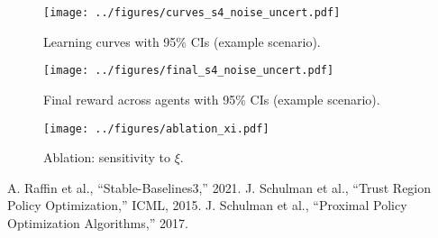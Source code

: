 \documentclass[10pt,conference]{IEEEtran}
\begin{document}
\begin{figure}[t]
\centering
\texttt{[image: ../figures/curves\_s4\_noise\_uncert.pdf]}
\caption{Learning curves with 95\% CIs (example scenario).}
\label{fig:curves}
\end{figure}

\begin{figure}[t]
\centering
\texttt{[image: ../figures/final\_s4\_noise\_uncert.pdf]}
\caption{Final reward across agents with 95\% CIs (example scenario).}
\label{fig:final}
\end{figure}

\begin{figure}[t]
\centering
\texttt{[image: ../figures/ablation\_xi.pdf]}
\caption{Ablation: sensitivity to $\xi$.}
\label{fig:ablation}
\end{figure}


\begin{thebibliography}{00}
 A. Raffin et al., ``Stable-Baselines3,'' 2021.
 J. Schulman et al., ``Trust Region Policy Optimization,'' ICML, 2015.
 J. Schulman et al., ``Proximal Policy Optimization Algorithms,'' 2017.
\end{thebibliography}
\end{document}

